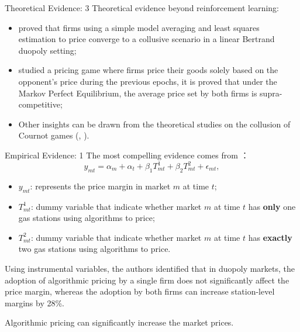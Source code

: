 \documentclass[8pt]{beamer}
\begin{document}
\begin{frame}{Theoretical Evidence: 3}
    Theoretical evidence beyond reinforcement learning:
    \small{
    \begin{itemize}
        \item \cite{cho2024collusive} proved that firms using a simple model averaging and least squares estimation to price converge to a collusive scenario in a linear Bertrand duopoly setting;
        \item \cite{lamba2022pricing} studied a pricing game where firms price their goods solely based on the opponent's price during the previous epochs, it is proved that under the Markov Perfect Equilibrium, the average price set by both firms is supra-competitive;
        \item Other insights can be drawn from the theoretical studies on the collusion of Cournot games (\cite{shi2020multi}, \cite{possnig2023reinforcement}).
    \end{itemize}
    }
\end{frame}

\begin{frame}{Empirical Evidence: 1}
    The most compelling evidence comes from \cite{clark2023algorithmic}：
    \[
        y_{mt}=\alpha_m+\alpha_t+\beta_1T_{mt}^1+\beta_2T_{mt}^2+\epsilon_{mt},
    \]
    \begin{itemize}
        \item $y_{mt}$: represents the price margin in market $m$ at time $t$; 
        \item $T_{mt}^1$: dummy variable that indicate whether market $m$ at time $t$ has \textbf{only} one gas stations using algorithms to price;
        \item $T_{mt}^2$: dummy variable that indicate whether market $m$ at time $t$ has \textbf{exactly} two gas stations using algorithms to price.
    \end{itemize}
    Using instrumental variables, the authors identified that in duopoly markets, the adoption of algorithmic pricing by a single firm does not significantly affect the price margin, whereas the adoption by both firms can increase station-level margins by 28\%. 

    \begin{center}
        Algorithmic pricing can significantly increase the market prices.
    \end{center}
\end{frame}
\end{document}
